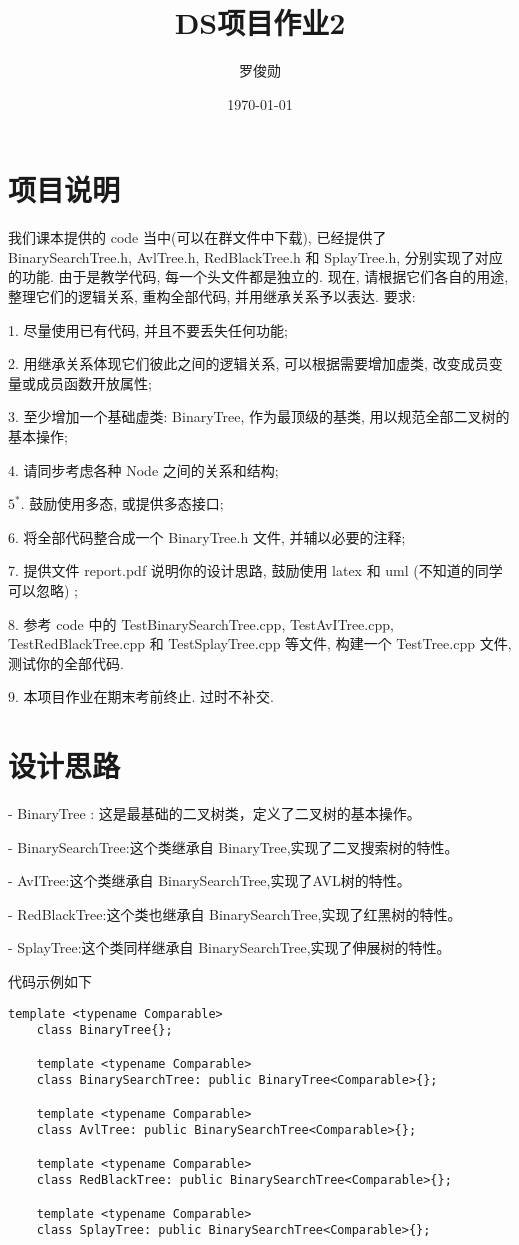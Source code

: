 \documentclass[12pt, a4paper, oneside]{ctexart}
\title{\huge\textbf{DS项目作业2}}
\author{罗俊勋}
\date{\today}
\begin{document}
\maketitle
\section*{项目说明}
我们课本提供的 code 当中(可以在群文件中下载), 已经提供了 BinarySearchTree.h, AvlTree.h, RedBlackTree.h 和 SplayTree.h, 分别实现了对应的功能. 由于是教学代码, 每一个头文件都是独立的. 现在, 请根据它们各自的用途, 整理它们的逻辑关系, 重构全部代码, 并用继承关系予以表达. 要求:

1. 尽量使用已有代码, 并且不要丢失任何功能;

2. 用继承关系体现它们彼此之间的逻辑关系, 可以根据需要增加虚类, 改变成员变量或成员函数开放属性;

3. 至少增加一个基础虚类: BinaryTree, 作为最顶级的基类, 用以规范全部二叉树的基本操作;

4. 请同步考虑各种 Node 之间的关系和结构;

$5^*$. 鼓励使用多态, 或提供多态接口;

6. 将全部代码整合成一个 BinaryTree.h 文件, 并辅以必要的注释;

7. 提供文件 report.pdf 说明你的设计思路, 鼓励使用 latex 和 uml (不知道的同学可以忽略) ;

8. 参考 code 中的 TestBinarySearchTree.cpp, TestAvITree.cpp, TestRedBlackTree.cpp 和 TestSplayTree.cpp 等文件, 构建一个 TestTree.cpp 文件, 测试你的全部代码.

9. 本项目作业在期末考前终止. 过时不补交.

\section*{设计思路}
- BinaryTree : 这是最基础的二叉树类，定义了二叉树的基本操作。

- BinarySearchTree:这个类继承自 BinaryTree,实现了二叉搜索树的特性。

- AvITree:这个类继承自 BinarySearchTree,实现了AVL树的特性。

- RedBlackTree:这个类也继承自 BinarySearchTree,实现了红黑树的特性。

- SplayTree:这个类同样继承自 BinarySearchTree,实现了伸展树的特性。

代码示例如下
\begin{lstlisting}[caption={}]
    template <typename Comparable>
    class BinaryTree{};
    
    template <typename Comparable>
    class BinarySearchTree: public BinaryTree<Comparable>{};
    
    template <typename Comparable>
    class AvlTree: public BinarySearchTree<Comparable>{};
    
    template <typename Comparable>
    class RedBlackTree: public BinarySearchTree<Comparable>{};
    
    template <typename Comparable>
    class SplayTree: public BinarySearchTree<Comparable>{};
\end{lstlisting}
\end{document}
